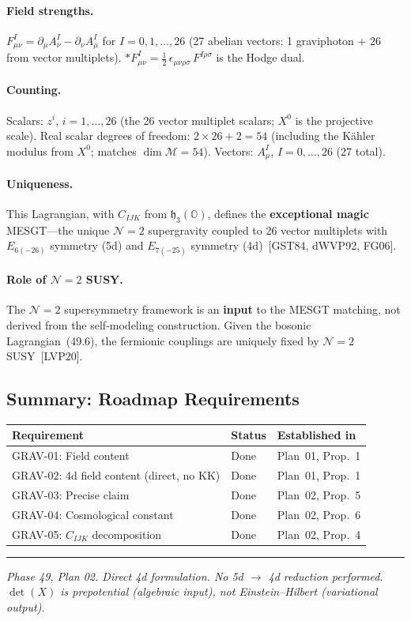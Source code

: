 \paragraph{Field strengths.}
$F^I_{\mu\nu} = \partial_\mu A^I_\nu - \partial_\nu A^I_\mu$
for $I = 0, 1, \ldots, 26$ (27 abelian vectors: 1 graviphoton + 26
from vector multiplets).
${*F}^I_{\mu\nu} = \frac{1}{2}\, \epsilon_{\mu\nu\rho\sigma}\,
F^{I\rho\sigma}$ is the Hodge dual.

\paragraph{Counting.}
Scalars: $z^i$, $i = 1, \ldots, 26$ (the 26 vector multiplet
scalars; $X^0$ is the projective scale).
Real scalar degrees of freedom: $2 \times 26 + 2 = 54$
(including the K\"ahler modulus from $X^0$; matches
$\dim \mathcal{M} = 54$).
Vectors: $A^I_\mu$, $I = 0, \ldots, 26$ (27 total).

\paragraph{Uniqueness.}
This Lagrangian, with $C_{IJK}$ from $\mathfrak{h}_3(\mathbb{O})$,
defines the \textbf{exceptional magic} MESGT---the unique
$\mathcal{N}=2$ supergravity coupled to 26 vector multiplets with
$E_{6(-26)}$ symmetry (5d) and $E_{7(-25)}$ symmetry
(4d)~[GST84, dWVP92, FG06].

\paragraph{Role of $\mathcal{N}=2$ SUSY.}
The $\mathcal{N}=2$ supersymmetry framework is an \textbf{input} to
the MESGT matching, not derived from the self-modeling construction.
Given the bosonic Lagrangian~(49.6), the fermionic couplings are
uniquely fixed by $\mathcal{N}=2$ SUSY~[LVP20].


\subsection*{Summary: Roadmap Requirements}

\begin{center}
\begin{tabular}{l|l|l}
\hline
\textbf{Requirement} & \textbf{Status} & \textbf{Established in} \\
\hline
GRAV-01: Field content & Done & Plan~01, Prop.~1 \\
GRAV-02: 4d field content (direct, no KK) & Done & Plan~01, Prop.~1 \\
GRAV-03: Precise claim & Done & Plan~02, Prop.~5 \\
GRAV-04: Cosmological constant & Done & Plan~02, Prop.~6 \\
GRAV-05: $C_{IJK}$ decomposition & Done & Plan~02, Prop.~4 \\
\hline
\end{tabular}
\end{center}

\vspace{1em}
\hrule
\vspace{0.5em}
\textit{Phase 49, Plan 02. Direct 4d formulation.
No 5d $\to$ 4d reduction performed.
$\det(X)$ is prepotential (algebraic input), not Einstein--Hilbert
(variational output).}

